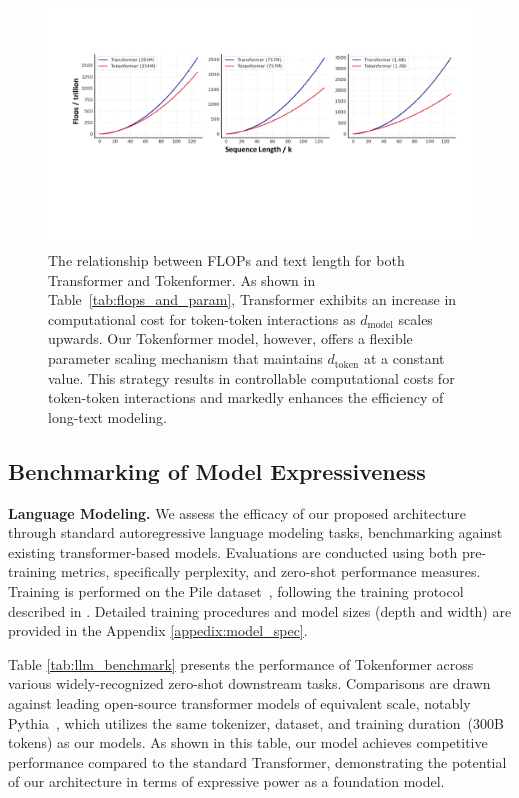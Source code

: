 \documentclass{article} %
\newcommand{\ourmethod}{Tokenformer\xspace}
\begin{document}
\begin{figure}[h]
    \centering
    \includegraphics[width=\linewidth]{./flops_figure.pdf}
    \caption{The relationship between FLOPs and text length for both Transformer and \ourmethod. As shown in Table~\ref{tab:flops_and_param}, Transformer exhibits an increase in computational cost for token-token interactions as $d_{\text{model}}$ scales upwards. Our \ourmethod model, however, offers a flexible parameter scaling mechanism that maintains $d_{\text{token}}$ at a constant value. This strategy results in controllable computational costs for token-token interactions and markedly enhances the efficiency of long-text modeling.}
    \label{fig:flops_figure}
\end{figure}

\subsection{Benchmarking of Model Expressiveness} \label{sec:llm}
\textbf{Language Modeling.} We assess the efficacy of our proposed architecture through standard autoregressive language modeling tasks, benchmarking against existing transformer-based models. Evaluations are conducted using both pre-training metrics, specifically perplexity, and zero-shot performance measures. Training is performed on the Pile dataset~\citep{gao2020pile}, following the training protocol described in \citet{biderman2023pythia}. Detailed training procedures and model sizes (depth and width) are provided in the Appendix \ref{appedix:model_spec}.

Table \ref{tab:llm_benchmark} presents the performance of \ourmethod across various widely-recognized zero-shot downstream tasks. Comparisons are drawn against leading open-source transformer models of equivalent scale, notably Pythia~\citep{biderman2023pythia}, which utilizes the same tokenizer, dataset, and training duration~(300B tokens) as our models. As shown in this table, our model achieves competitive performance compared to the standard Transformer, demonstrating the potential of our architecture in terms of expressive power as a foundation model.
\end{document}
